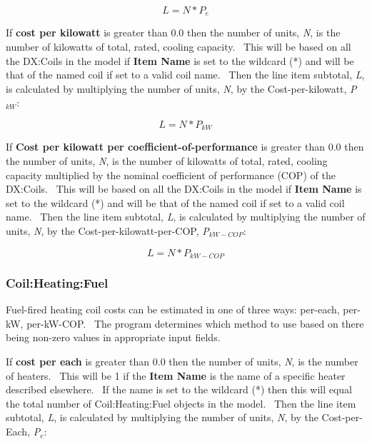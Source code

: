 \begin{equation}
L = N * {P_e}
\end{equation}

If \textbf{cost per kilowatt} is greater than 0.0 then the number of units, \emph{N}, is the number of kilowatts of total, rated, cooling capacity.~ This will be based on all the DX:Coils in the model if \textbf{Item Name} is set to the wildcard (*) and will be that of the named coil if set to a valid coil name.~ Then the line item subtotal, \emph{L}, is calculated by multiplying the number of units, \emph{N}, by the Cost-per-kilowatt, \emph{P\(_{kW}\)}:

\begin{equation}
L = N * {P_{kW}}
\end{equation}

If \textbf{Cost per kilowatt per coefficient-of-performance} is greater than 0.0 then the number of units, \emph{N}, is the number of kilowatts of total, rated, cooling capacity multiplied by the nominal coefficient of performance (COP) of the DX:Coils.~ This will be based on all the DX:Coils in the model if \textbf{Item Name} is set to the wildcard (*) and will be that of the named coil if set to a valid coil name.~ Then the line item subtotal, \emph{L}, is calculated by multiplying the number of units, \emph{N}, by the Cost-per-kilowatt-per-COP, \emph{P\(_{kW-COP}\)}:

\begin{equation}
L = N * {P_{kW - COP}}
\end{equation}

\subsubsection{Coil:Heating:Fuel}\label{coilheatinggas}

Fuel-fired heating coil costs can be estimated in one of three ways: per-each, per-kW, per-kW-COP.~ The program determines which method to use based on there being non-zero values in appropriate input fields.

If \textbf{cost per each} is greater than 0.0 then the number of units, \emph{N}, is the number of heaters.~ This will be 1 if the \textbf{Item Name} is the name of a specific heater described elsewhere.~ If the name is set to the wildcard (*) then this will equal the total number of Coil:Heating:Fuel objects in the model.~ Then the line item subtotal, \emph{L}, is calculated by multiplying the number of units, \emph{N}, by the Cost-per-Each, \emph{P\(_{e}\)}:

